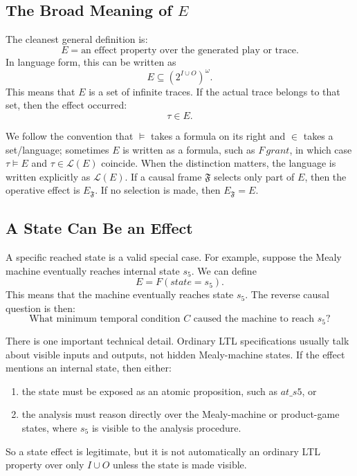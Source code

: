 \documentclass[11pt]{article}
\theoremstyle{remark}
\newcommand{\Lang}{\mathcal{L}}
\newcommand{\Frame}{\mathfrak{F}}
\begin{document}
\subsection{The Broad Meaning of \texorpdfstring{\(E\)}{E}}

The cleanest general definition is:
\[
  E = \text{an effect property over the generated play or trace.}
\]
In language form, this can be written as
\[
  E \subseteq (2^{I\cup O})^\omega .
\]
This means that \(E\) is a set of infinite traces. If the actual trace belongs
to that set, then the effect occurred:
\[
  \tau \in E .
\]

We follow the convention that \(\models\) takes a formula on its right and
\(\in\) takes a set/language; sometimes \(E\) is written as a formula, such as
\(F\,grant\), in which case \(\tau\models E\) and \(\tau\in\Lang(E)\) coincide.
When the distinction matters, the language is written explicitly as
\(\Lang(E)\). If a causal frame \(\Frame\)
selects only part of \(E\), then the operative effect is \(E_{\Frame}\). If no
selection is made, then \(E_{\Frame}=E\).

\subsection{A State Can Be an Effect}

A specific reached state is a valid special case. For example, suppose the
Mealy machine eventually reaches internal state \(s_5\). We can define
\[
  E = F(state=s_5).
\]
This means that the machine eventually reaches state \(s_5\). The reverse
causal question is then:
\[
  \text{What minimum temporal condition } C
  \text{ caused the machine to reach } s_5?
\]

There is one important technical detail. Ordinary LTL specifications usually
talk about visible inputs and outputs, not hidden Mealy-machine states. If the
effect mentions an internal state, then either:
\begin{enumerate}[label=\arabic*.]
  \item the state must be exposed as an atomic proposition, such as
        \(\mathit{at\_s5}\), or
  \item the analysis must reason directly over the Mealy-machine or product-game
        states, where \(s_5\) is visible to the analysis procedure.
\end{enumerate}

So a state effect is legitimate, but it is not automatically an ordinary LTL
property over only \(I\cup O\) unless the state is made visible.
\end{document}
